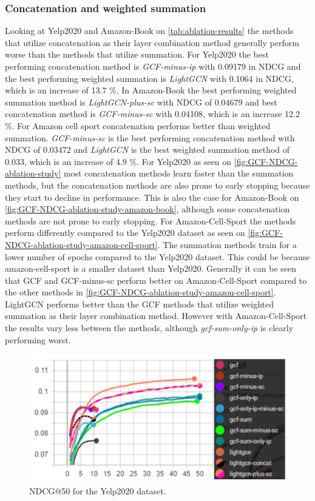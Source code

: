 \subsubsection{Concatenation and weighted summation}
Looking at Yelp2020 and Amazon-Book on \autoref{tab:ablation-results} the methods that utilize concatenation as their layer combination method generally perform worse than the methods that utilize summation.
For Yelp2020 the best performing concatenation method is \textit{GCF-minus-ip} with 0.09179 in NDCG and the best performing weighted summation is \textit{LightGCN} with 0.1064 in NDCG, which is an increase of 13.7 \%.
In Amazon-Book the best performing weighted summation method is \textit{LightGCN-plus-sc} with NDCG of 0.04679 and best concatenation method is \textit{GCF-minus-sc} with 0.04108, which is an increase 12.2 \%.
For Amazon cell sport concatenation performs better than weighted summation.
\textit{GCF-minus-sc} is the best performing concatenation method with NDCG of 0.03472 and \textit{LightGCN} is the best weighted summation method of 0.033, which is an increase of 4.9 \%.
For Yelp2020 as seen on \autoref{fig:GCF-NDCG-ablation-study} most concatenation methods learn faster than the summation methods, but the concatenation methods are also prone to early stopping because they start to decline in performance.
This is also the case for Amazon-Book on \autoref{fig:GCF-NDCG-ablation-study-amazon-book}, although some concatenation methods are not prone to early stopping.
For Amazon-Cell-Sport the methods perform differently compared to the Yelp2020 dataset as seen on \autoref{fig:GCF-NDCG-ablation-study-amazon-cell-sport}.
The summation methods train for a lower number of epochs compared to the Yelp2020 dataset.
This could be because amazon-cell-sport is a smaller dataset than Yelp2020.
Generally it can be seen that GCF and GCF-minus-sc perform better on Amazon-Cell-Sport compared to the other methods in \autoref{fig:GCF-NDCG-ablation-study-amazon-cell-sport}.
LightGCN performs better than the GCF methods that utilize weighted summation as their layer combination method.
However with Amazon-Cell-Sport the results vary less between the methods, although \textit{gcf-sum-only-ip} is clearly performing worst.
\begin{figure}[]
    \includegraphics[width=\linewidth]{figures/gcf-all-ndcg.png}
    \caption{NDCG@50 for the Yelp2020 dataset.}
    \label{fig:GCF-NDCG-ablation-study}
\end{figure}
